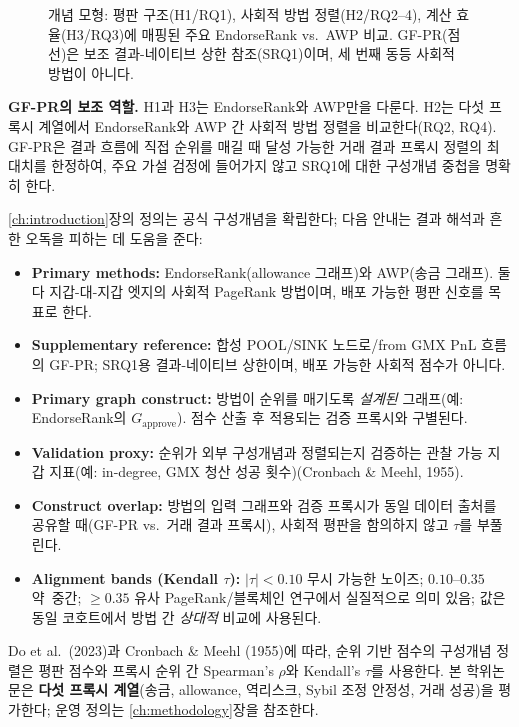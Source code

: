 \begin{figure}[htbp]
\centering

\caption{개념 모형: 평판 구조(H1/RQ1), 사회적 방법 정렬(H2/RQ2--4), 계산 효율(H3/RQ3)에 매핑된 주요 EndorseRank vs.\ AWP 비교. GF-PR(점선)은 보조 결과-네이티브 상한 참조(SRQ1)이며, 세 번째 동등 사회적 방법이 아니다.}
\label{fig:conceptual-model}
\end{figure}

\textbf{GF-PR의 보조 역할.} H1과 H3는 EndorseRank와 AWP만을 다룬다. H2는 다섯 프록시 계열에서 EndorseRank와 AWP 간 사회적 방법 정렬을 비교한다(RQ2, RQ4). GF-PR은 결과 흐름에 직접 순위를 매길 때 달성 가능한 거래 결과 프록시 정렬의 최대치를 한정하여, 주요 가설 검정에 들어가지 않고 SRQ1에 대한 구성개념 중첩을 명확히 한다.


\ref{ch:introduction}장의 정의는 공식 구성개념을 확립한다; 다음 안내는 결과 해석과 흔한 오독을 피하는 데 도움을 준다:

\begin{itemize}
\item \textbf{Primary methods:} EndorseRank(allowance 그래프)와 AWP(송금 그래프). 둘 다 지갑-대-지갑 엣지의 사회적 PageRank 방법이며, 배포 가능한 평판 신호를 목표로 한다.
\item \textbf{Supplementary reference:} 합성 POOL/SINK 노드로/from GMX PnL 흐름의 GF-PR; SRQ1용 결과-네이티브 상한이며, 배포 가능한 사회적 점수가 아니다.
\item \textbf{Primary graph construct:} 방법이 순위를 매기도록 \emph{설계된} 그래프(예: EndorseRank의 $G_{\text{approve}}$). 점수 산출 후 적용되는 검증 프록시와 구별된다.
\item \textbf{Validation proxy:} 순위가 외부 구성개념과 정렬되는지 검증하는 관찰 가능 지갑 지표(예: in-degree, GMX 청산 성공 횟수)(Cronbach \& Meehl, 1955).
\item \textbf{Construct overlap:} 방법의 입력 그래프와 검증 프록시가 동일 데이터 출처를 공유할 때(GF-PR vs.\ 거래 결과 프록시), 사회적 평판을 함의하지 않고 $\tau$를 부풀린다.
\item \textbf{Alignment bands (Kendall $\tau$):} $|\tau|<0.10$ 무시 가능한 노이즈; $0.10$--$0.35$ 약~중간; $\geq 0.35$ 유사 PageRank/블록체인 연구에서 실질적으로 의미 있음; 값은 동일 코호트에서 방법 간 \emph{상대적} 비교에 사용된다.
\end{itemize}


Do et al.\ (2023)과 Cronbach \& Meehl (1955)에 따라, 순위 기반 점수의 구성개념 정렬은 평판 점수와 프록시 순위 간 Spearman's $\rho$와 Kendall's $\tau$를 사용한다. 본 학위논문은 \textbf{다섯 프록시 계열}(송금, allowance, 역리스크, Sybil 조정 안정성, 거래 성공)을 평가한다; 운영 정의는 \ref{ch:methodology}장을 참조한다.
